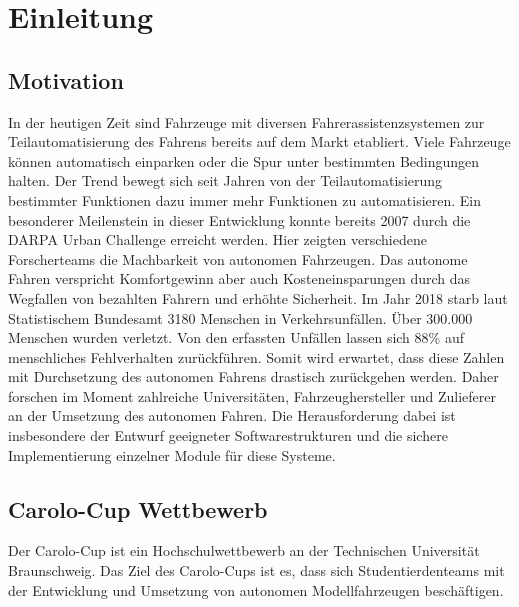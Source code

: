 
\chapter{Einleitung}
\section{Motivation}
In der heutigen Zeit sind Fahrzeuge mit diversen Fahrerassistenzsystemen  zur Teilautomatisierung des Fahrens bereits auf dem Markt etabliert. Viele Fahrzeuge können automatisch einparken oder die Spur unter bestimmten Bedingungen halten. Der Trend bewegt sich seit Jahren von der Teilautomatisierung bestimmter Funktionen dazu immer mehr Funktionen zu automatisieren. Ein besonderer Meilenstein in dieser Entwicklung konnte bereits 2007 durch die DARPA Urban Challenge erreicht werden. Hier zeigten verschiedene Forscherteams die Machbarkeit von autonomen Fahrzeugen. Das autonome Fahren verspricht Komfortgewinn aber auch Kosteneinsparungen durch das Wegfallen von bezahlten Fahrern und erhöhte Sicherheit. Im Jahr 2018 starb laut Statistischem Bundesamt \cite{STA18} 3180 Menschen in Verkehrsunfällen. Über 300.000 Menschen wurden verletzt. Von den erfassten Unfällen lassen sich 88\% auf menschliches Fehlverhalten zurückführen.
Somit wird erwartet, dass diese Zahlen mit Durchsetzung des autonomen Fahrens drastisch zurückgehen werden. Daher forschen im Moment zahlreiche Universitäten, Fahrzeughersteller und Zulieferer an der Umsetzung des autonomen Fahren. Die Herausforderung dabei ist insbesondere der Entwurf geeigneter Softwarestrukturen und die sichere Implementierung einzelner Module für diese Systeme.

\section{Carolo-Cup Wettbewerb}
Der Carolo-Cup ist ein Hochschulwettbewerb an der Technischen Universität Braunschweig. Das Ziel des Carolo-Cups ist es, dass sich Studentierdenteams  mit der Entwicklung und Umsetzung von autonomen Modellfahrzeugen beschäftigen.

